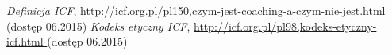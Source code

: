 \begin{thebibliography}{99}

 \textit{Definicja ICF}, \url{http://icf.org.pl/pl150,czym-jest-coaching-a-czym-nie-jest.html} (dostęp 06.2015)
 \textit{Kodeks etyczny ICF}, \url{ http://icf.org.pl/pl98,kodeks-etyczny-icf.html } (dostęp 06.2015)
\end{thebibliography}
